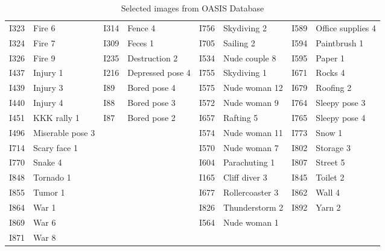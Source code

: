 \begin{table}[]
{\begin{tabular}{llllllll}
		I323  & Fire 6            & I314 & Fence 4           & I756   & Skydiving 2      & I589 & Office supplies 4 \\
		I324  & Fire 7            & I309 & Feces 1           & I705   & Sailing 2        & I594 & Paintbrush 1      \\
		I326  & Fire 9            & I235 & Destruction 2     & I534   & Nude couple 8    & I595 & Paper 1           \\
		I437  & Injury 1          & I216 & Depressed pose 4  & I755   & Skydiving 1      & I671 & Rocks 4           \\
		I439  & Injury 3          & I89  & Bored pose 4      & I575   & Nude woman 12    & I679 & Roofing 2         \\
		I440  & Injury 4          & I88  & Bored pose 3      & I572   & Nude woman 9     & I764 & Sleepy pose 3     \\
		I451  & KKK rally 1       & I87  & Bored pose 2      & I657   & Rafting 5        & I765 & Sleepy pose 4     \\
		I496  & Miserable pose 3  &      &                   & I574   & Nude woman 11    & I773 & Snow 1            \\
		I714  & Scary face 1      &      &                   & I570   & Nude woman 7     & I802 & Storage 3         \\
		I770  & Snake 4           &      &                   & I604   & Parachuting 1    & I807 & Street 5          \\
		I848  & Tornado 1         &      &                   & I165   & Cliff diver 3    & I845 & Toilet 2          \\
		I855  & Tumor 1           &      &                   & I677   & Rollercoaster 3  & I862 & Wall 4            \\
		I864  & War 1             &      &                   & I826   & Thunderstorm 2   & I892 & Yarn 2            \\
		I869  & War 6             &      &                   & I564   & Nude woman 1     &      &                   \\
		I871  & War 8             &      &                   &        &                  &      &                  
	\end{tabular}%
	}
	\caption{Selected images from OASIS Database}
	\label{table:oasis-images}
\end{table}
